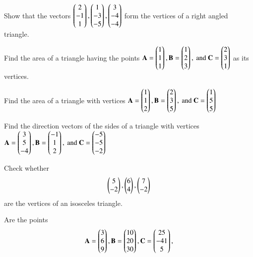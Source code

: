 \item Show that the vectors 
$
\begin{pmatrix}2\\-1 \\1\end{pmatrix},
\begin{pmatrix}1\\-3 \\-5\end{pmatrix},
\begin{pmatrix}3\\ -4\\-4\end{pmatrix}
$
form the vertices of a right angled triangle.
\item Find the area of a triangle having the points 
$
\mathbf{A} = \begin{pmatrix}1\\1 \\1\end{pmatrix},
\mathbf{B} = \begin{pmatrix}1\\2 \\3\end{pmatrix}, \text{ and }
\mathbf{C} = \begin{pmatrix}2\\ 3\\1\end{pmatrix}
$
as its vertices.
\item Find the area of a triangle with vertices
$
\mathbf{A} = \begin{pmatrix}1\\1 \\2\end{pmatrix},
\mathbf{B} = \begin{pmatrix}2\\3 \\5\end{pmatrix}, \text{ and }
\mathbf{C} = \begin{pmatrix}1\\ 5\\5\end{pmatrix}
$
\item Find the direction vectors of the sides of a triangle with vertices
$
\mathbf{A} = \begin{pmatrix}3\\5 \\-4\end{pmatrix},
\mathbf{B} = \begin{pmatrix}-1\\1 \\2\end{pmatrix}, \text{ and }
\mathbf{C} = \begin{pmatrix}-5\\ -5\\-2\end{pmatrix}
$
\item Check whether 
\begin{align}
\begin{pmatrix}5\\-2\end{pmatrix}, \begin{pmatrix}6\\4\end{pmatrix}, \begin{pmatrix}7\\-2\end{pmatrix}
\end{align}
are the vertices of an isosceles triangle.
%
 \item Are the points 
\begin{align}
\mathbf{A} = \begin{pmatrix}3\\6 \\9\end{pmatrix},
\mathbf{B} = \begin{pmatrix}10\\20 \\30\end{pmatrix},
\mathbf{C} = \begin{pmatrix}25\\ -41\\5\end{pmatrix},
\end{align}
